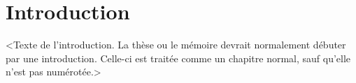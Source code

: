 \chapter*{Introduction}         %
\label{chap-introduction}       %

<Texte de l'introduction. La thèse ou le mémoire devrait normalement
débuter par une introduction. Celle-ci est traitée comme un chapitre
normal, sauf qu'elle n'est pas numérotée.>
